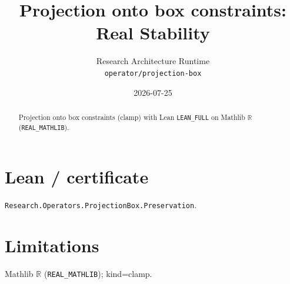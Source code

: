 \documentclass[11pt]{article}
\title{Projection onto box constraints: Real Stability}
\author{Research Architecture Runtime \\ \texttt{operator/projection-box}}
\date{2026-07-25}
\begin{document}
\maketitle
\begin{abstract}
Projection onto box constraints (clamp) with Lean \texttt{LEAN\_FULL} on Mathlib $\mathbb{R}$ (\texttt{REAL\_MATHLIB}).
\end{abstract}
\section{Lean / certificate}
\texttt{Research.Operators.ProjectionBox.Preservation}.
\section{Limitations}
Mathlib $\mathbb{R}$ (\texttt{REAL\_MATHLIB}); kind=clamp.
\end{document}
